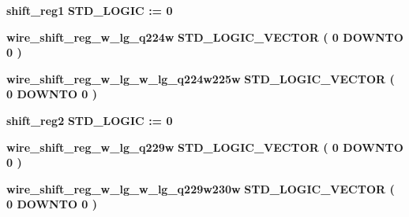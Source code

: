 \begin{DoxyCompactItemize}
\item 
{\bf shift\+\_\+reg1} {\bfseries \textcolor{comment}{S\+T\+D\+\_\+\+L\+O\+G\+IC}\textcolor{vhdlchar}{ }\textcolor{vhdlchar}{ }\textcolor{vhdlchar}{\+:}\textcolor{vhdlchar}{=}\textcolor{vhdlchar}{ }\textcolor{vhdlchar}{ }\textcolor{vhdlchar}{\textquotesingle{}}\textcolor{vhdlchar}{ } \textcolor{vhdldigit}{0} \textcolor{vhdlchar}{ }\textcolor{vhdlchar}{\textquotesingle{}}\textcolor{vhdlchar}{ }} 
\item 
{\bf wire\+\_\+shift\+\_\+reg\+\_\+w\+\_\+lg\+\_\+q224w} {\bfseries \textcolor{comment}{S\+T\+D\+\_\+\+L\+O\+G\+I\+C\+\_\+\+V\+E\+C\+T\+OR}\textcolor{vhdlchar}{ }\textcolor{vhdlchar}{(}\textcolor{vhdlchar}{ }\textcolor{vhdlchar}{ } \textcolor{vhdldigit}{0} \textcolor{vhdlchar}{ }\textcolor{keywordflow}{D\+O\+W\+N\+TO}\textcolor{vhdlchar}{ }\textcolor{vhdlchar}{ } \textcolor{vhdldigit}{0} \textcolor{vhdlchar}{ }\textcolor{vhdlchar}{)}\textcolor{vhdlchar}{ }} 
\item 
{\bf wire\+\_\+shift\+\_\+reg\+\_\+w\+\_\+lg\+\_\+w\+\_\+lg\+\_\+q224w225w} {\bfseries \textcolor{comment}{S\+T\+D\+\_\+\+L\+O\+G\+I\+C\+\_\+\+V\+E\+C\+T\+OR}\textcolor{vhdlchar}{ }\textcolor{vhdlchar}{(}\textcolor{vhdlchar}{ }\textcolor{vhdlchar}{ } \textcolor{vhdldigit}{0} \textcolor{vhdlchar}{ }\textcolor{keywordflow}{D\+O\+W\+N\+TO}\textcolor{vhdlchar}{ }\textcolor{vhdlchar}{ } \textcolor{vhdldigit}{0} \textcolor{vhdlchar}{ }\textcolor{vhdlchar}{)}\textcolor{vhdlchar}{ }} 
\item 
{\bf shift\+\_\+reg2} {\bfseries \textcolor{comment}{S\+T\+D\+\_\+\+L\+O\+G\+IC}\textcolor{vhdlchar}{ }\textcolor{vhdlchar}{ }\textcolor{vhdlchar}{\+:}\textcolor{vhdlchar}{=}\textcolor{vhdlchar}{ }\textcolor{vhdlchar}{ }\textcolor{vhdlchar}{\textquotesingle{}}\textcolor{vhdlchar}{ } \textcolor{vhdldigit}{0} \textcolor{vhdlchar}{ }\textcolor{vhdlchar}{\textquotesingle{}}\textcolor{vhdlchar}{ }} 
\item 
{\bf wire\+\_\+shift\+\_\+reg\+\_\+w\+\_\+lg\+\_\+q229w} {\bfseries \textcolor{comment}{S\+T\+D\+\_\+\+L\+O\+G\+I\+C\+\_\+\+V\+E\+C\+T\+OR}\textcolor{vhdlchar}{ }\textcolor{vhdlchar}{(}\textcolor{vhdlchar}{ }\textcolor{vhdlchar}{ } \textcolor{vhdldigit}{0} \textcolor{vhdlchar}{ }\textcolor{keywordflow}{D\+O\+W\+N\+TO}\textcolor{vhdlchar}{ }\textcolor{vhdlchar}{ } \textcolor{vhdldigit}{0} \textcolor{vhdlchar}{ }\textcolor{vhdlchar}{)}\textcolor{vhdlchar}{ }} 
\item 
{\bf wire\+\_\+shift\+\_\+reg\+\_\+w\+\_\+lg\+\_\+w\+\_\+lg\+\_\+q229w230w} {\bfseries \textcolor{comment}{S\+T\+D\+\_\+\+L\+O\+G\+I\+C\+\_\+\+V\+E\+C\+T\+OR}\textcolor{vhdlchar}{ }\textcolor{vhdlchar}{(}\textcolor{vhdlchar}{ }\textcolor{vhdlchar}{ } \textcolor{vhdldigit}{0} \textcolor{vhdlchar}{ }\textcolor{keywordflow}{D\+O\+W\+N\+TO}\textcolor{vhdlchar}{ }\textcolor{vhdlchar}{ } \textcolor{vhdldigit}{0} \textcolor{vhdlchar}{ }\textcolor{vhdlchar}{)}\textcolor{vhdlchar}{ }} 

\end{DoxyCompactItemize}
